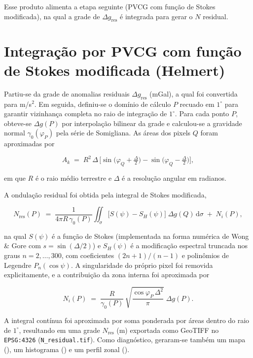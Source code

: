 Esse produto alimenta a etapa seguinte (PVCG com função de Stokes modificada), na qual a grade de $\Delta g_{\text{res}}$ é integrada para gerar o $N$ residual.


\section{Integração por PVCG com função de Stokes modificada (Helmert)}

Partiu-se da grade de anomalias residuais $\Delta g_{\text{res}}$ (mGal), a qual foi convertida para m/s$^2$. Em seguida, definiu-se o domínio de cálculo $P$ recuado em $1^\circ$ para garantir vizinhança completa no raio de integração de $1^\circ$. Para cada ponto $P$, obteve-se $\Delta g(P)$ por interpolação bilinear da grade e calculou-se a gravidade normal $\gamma_0(\varphi_P)$ pela série de Somigliana. As áreas dos pixels $Q$ foram aproximadas por

\begin{equation}
    A_k \;=\; R^2\,\Delta \,\bigl[\sin\!\bigl(\varphi_Q+\tfrac{\Delta}{2}\bigr)-\sin\!\bigl(\varphi_Q-\tfrac{\Delta}{2}\bigr)\bigr],
\end{equation}

\noindent em que $R$ é o raio médio terrestre e $\Delta$ é a resolução angular em radianos.

A ondulação residual foi obtida pela integral de Stokes modificada,

\begin{equation}
N_{\text{res}}(P) \;=\; \frac{1}{4\pi R\,\gamma_0(P)}
\iint_{\sigma}\!\bigl[S(\psi)-S_H(\psi)\bigr]\;\Delta g(Q)\,\mathrm{d}\sigma \;+\; N_i(P),
\end{equation}


\noindent na qual $S(\psi)$ é a função de Stokes (implementada na forma numérica de Wong \& Gore com $s=\sin(\Delta/2)$) e $S_H(\psi)$ é a modificação espectral truncada nos graus $n=2,\ldots,300$, com coeficientes $(2n+1)/(n-1)$ e polinômios de Legendre $P_n(\cos\psi)$. A singularidade do próprio pixel foi removida explicitamente, e a contribuição da zona interna foi aproximada por

\begin{equation}
    N_i(P) \;=\; \frac{R}{\gamma_0(P)}\,
    \sqrt{\frac{\cos\varphi_P\,\Delta^2}{\pi}}\;\Delta g(P).
\end{equation}

A integral contínua foi aproximada por soma ponderada por áreas dentro do raio de $1^\circ$, resultando em uma grade $N_{\text{res}}$ (m) exportada como GeoTIFF no \texttt{EPSG:4326} (\texttt{N\allowbreak\_residual.tif}). Como diagnóstico, geraram-se também um mapa (), um histograma () e um perfil zonal ().




